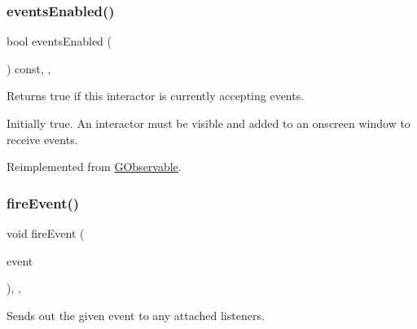 \mbox{\label{classGInteractor_a597a370b592e3737d38d9d2f4e2031ea}} 
\subsubsection{\texorpdfstring{events\+Enabled()}{eventsEnabled()}}
{\footnotesize\ttfamily bool events\+Enabled (\begin{DoxyParamCaption}{ }\end{DoxyParamCaption}) const\hspace{0.3cm}{\ttfamily [override]}, {\ttfamily [virtual]}, {\ttfamily [inherited]}}



Returns true if this interactor is currently accepting events. 

Initially true. An interactor must be visible and added to an onscreen window to receive events. 

Reimplemented from \mbox{\hyperlink{classGObservable_a8ebb3da91032e7f4c34485dabc518b8a}{G\+Observable}}.

\mbox{\label{classGObservable_a63e5e5a6227c59c928493b11aceb0f67}} 
\subsubsection{\texorpdfstring{fire\+Event()}{fireEvent()}}
{\footnotesize\ttfamily void fire\+Event (\begin{DoxyParamCaption}\item[{\mbox{\hyperlink{classGEvent}{G\+Event}} \&}]{event }\end{DoxyParamCaption})\hspace{0.3cm}{\ttfamily [protected]}, {\ttfamily [virtual]}, {\ttfamily [inherited]}}



Sends out the given event to any attached listeners. 

\mbox{\label{classGObservable_ab3983ea07337b52020a29cc00c653d8d}} 
